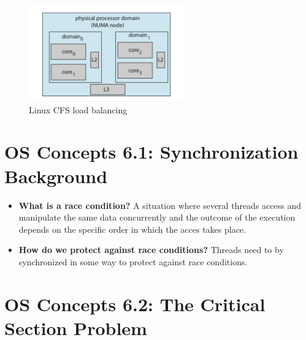 \documentclass[12pt]{article}
\begin{document}
\begin{itemize}
    \begin{figure}[ht]
        \centering
        \includegraphics[width=0.6\textwidth]{figures/cfs-load-balancing.jpg}
        \caption{Linux CFS load balancing}
        \label{fig:cfs-load-balancing}
    \end{figure}
\end{itemize}

\section*{OS Concepts 6.1: Synchronization Background}

\begin{itemize}
    \item \textbf{What is a race condition?} A situation where several threads access and manipulate the same data concurrently and the outcome of the execution depends on the specific order in which the acces takes place.
    \item \textbf{How do we protect against race conditions?} Threads need to by synchronized in some way to protect against race conditions.
\end{itemize}

\section*{OS Concepts 6.2: The Critical Section Problem}
\end{document}
